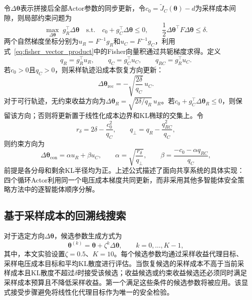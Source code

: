 \documentclass[final,5p,times]{elsarticle}
\begin{document}
令$\Delta\boldsymbol{\theta}$表示拼接后全部Actor参数的同步更新，令$c_0=\widetilde J_C(\boldsymbol{\theta})-d$为采样成本间隙，则局部约束问题为
\begin{equation}
  \label{eq:local_constrained_update}
  \max_{\Delta\boldsymbol{\theta}}\; g_R^{\top}\Delta\boldsymbol{\theta}
  \quad\mathrm{s.t.}\quad c_0+g_C^{\top}\Delta\boldsymbol{\theta}\leq0,\qquad
  \frac{1}{2}\Delta\boldsymbol{\theta}^{\top}F\Delta\boldsymbol{\theta}\leq\delta.
\end{equation}
两个自然梯度坐标分别为$u_R=F^{-1}g_R$和$u_C=F^{-1}g_C$，利用式~\eqref{eq:fisher_vector_product}中的Fisher向量积通过共轭梯度求得。定义
\begin{equation}
  q_R=g_R^{\top}u_R,\qquad q_C=g_C^{\top}u_C,\qquad q_{RC}=g_R^{\top}u_C.
\end{equation}
若$c_0>0$且$q_C>0$，则采样轨迹沿成本恢复方向更新：
\begin{equation}
  \label{eq:recovery_direction}
  \Delta\boldsymbol{\theta}_{\mathrm{rec}}=-\sqrt{\frac{2\delta}{q_C}}\,u_C.
\end{equation}
对于可行轨迹，无约束收益方向为$\Delta\boldsymbol{\theta}_R=\sqrt{2\delta/q_R}\,u_R$。若$c_0+g_C^{\top}\Delta\boldsymbol{\theta}_R\leq0$，则保留该方向；否则将更新置于线性化成本边界和KL椭球的交集上。令
\begin{equation}
  r_\delta=2\delta-\frac{c_0^2}{q_C},\qquad
  q_\perp=q_R-\frac{q_{RC}^2}{q_C},
\end{equation}
则约束方向为
\begin{equation}
  \label{eq:intersection_direction}
  \Delta\boldsymbol{\theta}_{\mathrm{con}}=\alpha u_R+\beta u_C,\qquad
  \alpha=\sqrt{\frac{r_\delta}{q_\perp}},\qquad
  \beta=\frac{-c_0-\alpha q_{RC}}{q_C},
\end{equation}
前提是各分母和剩余KL半径均为正。上述公式描述了面向共享系统的具体实现：四个循环Actor利用同一个电压成本梯度共同更新，而非采用其他多智能体安全策略方法中的逐智能体顺序分解。

\subsection{基于采样成本的回溯线搜索}
\label{sec:backtracking}

对于选定方向$\Delta\boldsymbol{\theta}$，候选参数生成方式为
\begin{equation}
  \label{eq:backtracking_candidate}
  \boldsymbol{\theta}^{(k)}=\boldsymbol{\theta}+\zeta^k\Delta\boldsymbol{\theta},\qquad
  k=0,\ldots,K-1,
\end{equation}
其中，本文实验设置$\zeta=0.5$、$K=10$。每个候选参数均通过采样收益代理目标、采样电压成本目标和平均KL散度进行评估。当恢复候选的采样成本不高于当前采样成本且KL散度不超过$\delta$时接受该候选；收益候选或约束收益候选还必须同时满足采样成本预算且不降低采样收益。第一个满足这些条件的候选参数将被应用。该显式接受步骤避免将线性化代理目标作为唯一的安全检验。
\end{document}
